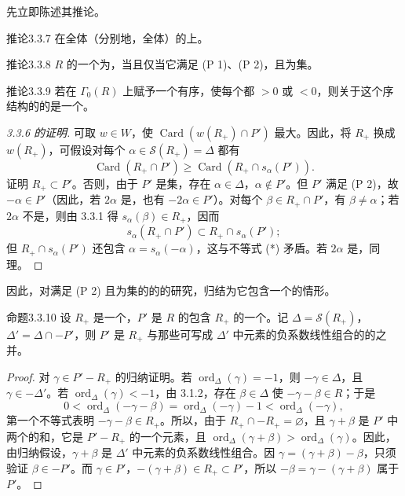 先立即陈述其推论。
\begin{SGAresult}{推论}{3.3.7}
在全体（分别地，全体）的上。
\end{SGAresult}
\begin{SGAresult}{推论}{3.3.8}
$R$ 的一个为，当且仅当它满足 (P 1)、(P 2)，且为集。
\end{SGAresult}
\begin{SGAresult}{推论}{3.3.9}
若在 $\Gamma_0(R)$ 上赋予一个有序，使每个都 $>0$ 或 $<0$，则关于这个序结构的的是一个。
\end{SGAresult}
\begin{proof}[3.3.6 的证明]
可取 $w\in W$，使 $\operatorname{Card}(w(R_+)\cap P')$ 最大。因此，将 $R_+$ 换成 $w(R_+)$，可假设对每个 $\alpha\in\mathscr S(R_+)=\Delta$ 都有
\[\operatorname{Card}(R_+\cap P')\geq\operatorname{Card}(R_+\cap s_\alpha(P')).\tag{*}\]
证明 $R_+\subset P'$。否则，由于 $P'$ 是集，存在 $\alpha\in\Delta$，$\alpha\notin P'$。但 $P'$ 满足 (P 2)，故 $-\alpha\in P'$（因此，若 $2\alpha$ 是，也有 $-2\alpha\in P'$）。对每个 $\beta\in R_+\cap P'$，有 $\beta\ne\alpha$；若 $2\alpha$ 不是，则由 3.3.1 得 $s_\alpha(\beta)\in R_+$，因而
\[s_\alpha(R_+\cap P')\subset R_+\cap s_\alpha(P');\]
但 $R_+\cap s_\alpha(P')$ 还包含 $\alpha=s_\alpha(-\alpha)$，这与不等式 (*) 矛盾。若 $2\alpha$ 是，同理。
\end{proof}
因此，对满足 (P 2) 且为集的的的研究，归结为它包含一个的情形。
\begin{SGAresult}{命题}{3.3.10}
设 $R_+$ 是一个，$P'$ 是 $R$ 的包含 $R_+$ 的一个。记 $\Delta=\mathscr S(R_+)$，$\Delta'=\Delta\cap-P'$，则 $P'$ 是 $R_+$ 与那些可写成 $\Delta'$ 中元素的负系数线性组合的的之并。
\end{SGAresult}
\begin{proof}
对 $\gamma\in P'-R_+$ 的归纳证明。若 $\operatorname{ord}_\Delta(\gamma)=-1$，则 $-\gamma\in\Delta$，且 $\gamma\in-\Delta'$。若 $\operatorname{ord}_\Delta(\gamma)<-1$，由 3.1.2，存在 $\beta\in\Delta$ 使 $-\gamma-\beta\in R$；于是
\[0<\operatorname{ord}_\Delta(-\gamma-\beta)=\operatorname{ord}_\Delta(-\gamma)-1<\operatorname{ord}_\Delta(-\gamma),\]
第一个不等式表明 $-\gamma-\beta\in R_+$。所以，由于 $R_+\cap-R_+=\varnothing$，且 $\gamma+\beta$ 是 $P'$ 中两个的和，它是 $P'-R_+$ 的一个元素，且 $\operatorname{ord}_\Delta(\gamma+\beta)>\operatorname{ord}_\Delta(\gamma)$。因此，由归纳假设，$\gamma+\beta$ 是 $\Delta'$ 中元素的负系数线性组合。因 $\gamma=(\gamma+\beta)-\beta$，只须验证 $\beta\in-P'$。而 $\gamma\in P'$，$-(\gamma+\beta)\in R_+\subset P'$，所以 $-\beta=\gamma-(\gamma+\beta)$ 属于 $P'$。
\end{proof}
